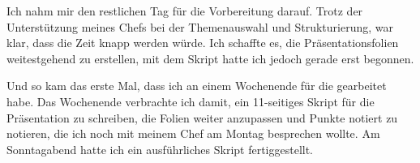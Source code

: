 Ich nahm mir den restlichen Tag für die Vorbereitung darauf.
Trotz der Unterstützung meines Chefs bei der Themenauswahl und Strukturierung, war klar, dass die Zeit knapp werden würde.
Ich schaffte es, die Präsentationsfolien weitestgehend zu erstellen, mit dem Skript hatte ich jedoch gerade erst begonnen.

\sweekdaymarginpar{\weekdaySaturdayShort, \weekdaySundayShort}

Und so kam das erste Mal, dass ich an einem Wochenende für die {\metaeffekt} gearbeitet habe.
Das Wochenende verbrachte ich damit, ein 11-seitiges Skript für die Präsentation zu schreiben, die Folien weiter anzupassen und Punkte notiert zu notieren, die ich noch mit meinem Chef am Montag besprechen wollte.
Am Sonntagabend hatte ich ein ausführliches Skript fertiggestellt.
